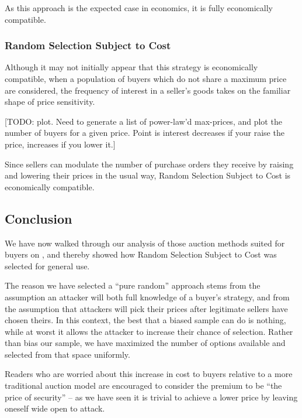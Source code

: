 As this approach is the expected case in economics, it is fully
economically compatible.

\subsubsection{Random Selection Subject to Cost}

Although it may not initially appear that this strategy is
economically compatible, when a population of buyers which do not
share a maximum price are considered, the frequency of interest in a
seller's goods takes on the familiar shape of price sensitivity.

[TODO: plot. Need to generate a list of power-law'd max-prices, and
  plot the number of buyers for a given price. Point is interest
  decreases if your raise the price, increases if you lower it.]

Since sellers can modulate the number of purchase orders they receive
by raising and lowering their prices in the usual way, Random
Selection Subject to Cost is economically compatible.

\subsection{Conclusion}

We have now walked through our analysis of those auction methods
suited for buyers on \tOM{}, and thereby showed how Random Selection
Subject to Cost was selected for general use.

The reason we have selected a ``pure random'' approach stems from the
assumption an attacker will both full knowledge of a buyer's strategy,
and from the assumption that attackers will pick their prices after
legitimate sellers have chosen theirs.  In this context, the best that
a biased sample can do is nothing, while at worst it allows the
attacker to increase their chance of selection. Rather than bias our
sample, we have maximized the number of options available and selected
from that space uniformly.

Readers who are worried about this increase in cost to buyers relative
to a more traditional auction model are encouraged to consider the
premium to be ``the price of security'' -- as we have seen it is
trivial to achieve a lower price by leaving oneself wide open to
attack.
